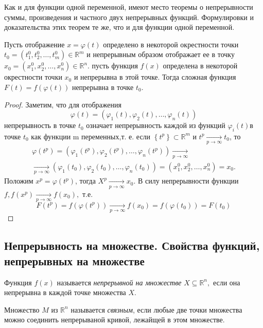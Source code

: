 Как и для функции одной переменной, имеют место теоремы о непрерывности суммы, произведения и частного двух непрерывных функций. Формулировки и доказательства этих теорем те же, что и для функции одной переменной.

\begin{theorem}
    Пусть отображение $x = \varphi(t)$ определено в некоторой окрестности точки $t_0=(t_1^0, t_2^0,\ldots,t_m^0)\in \mathbb{R}^m $ 
    и непрерывным образом отображает ее в точку $x_0=(x_1^0, x_2^0, \ldots, x_n^0)\in \mathbb{R}^n$. пусть функция $f(x)$ определена в некоторой окрестности точки 
    $x_0$ и непрерывна в этой точке. Тогда сложная функция $F(t)=f(\varphi(t))$ непрерывна в точке $t_0$.
\end{theorem}
\begin{proof}
    Заметим, что для отображения 
    \[\varphi(t)=(\varphi_{1}(t),\varphi_{2}(t),\ldots,\varphi_{n}(t))\]
    непрерывность в точке $t_0$ означает непрерывность каждой из функций $\varphi_i(t)$в точке $t_0$ как функции m переменных,т. е. если
    $\left\{ t^p\right\}\subset \mathbb{R}^m$ и $t^p \xrightarrow[p\rightarrow\infty]{}t_0 $, то
    \begin{multline}
        \displaystyle
        \varphi(t^{p})=(\varphi_{1}(t^{p}),\varphi_{2}(t^{p}),\ldots,\varphi_{n}(t^{p}))\xrightarrow[p\rightarrow\infty]{} \\
        \xrightarrow[p\rightarrow\infty]{} (\varphi_{1}(t_{0}), \varphi_{2}(t_{0}),\ldots ,\varphi_{n}(t_{0}))=(x_{1}^{0},x_{2}^{0},\ldots , x_{n}^{0})=x_{0}.
    \end{multline}
    Положим $x^{p}=\varphi(t^{p})$, тогда $X^{p}\xrightarrow[p\rightarrow\infty]{}x_{0}$. В силу непрерывности функции $f, f(x^{p})\xrightarrow[p\rightarrow\infty]{}f(x_{0}),$ т.е.
    \[F(t^{p})=f(\varphi(t^{p}))\xrightarrow[p\rightarrow\infty]{} f(x_{0})=f(\varphi(t_{0}))=F(t_{0})\]
\end{proof}
\subsection{Непрерывность на множестве. Свойства функций, непрерывных на множестве}
\begin{definition}
    Функция $f(x)$ называется \emph{непрерывной на множестве} $X\subseteq \mathbb{R}^n,$ если она непрерывна в каждой точке множества $X$.
\end{definition}
\begin{definition}
    Множество $M$ из $\mathbb{R}^{n}$ называется \emph{связным}, если любые две точки множества можно соединить непрерываной кривой, лежайщей в этом множестве.
\end{definition}

